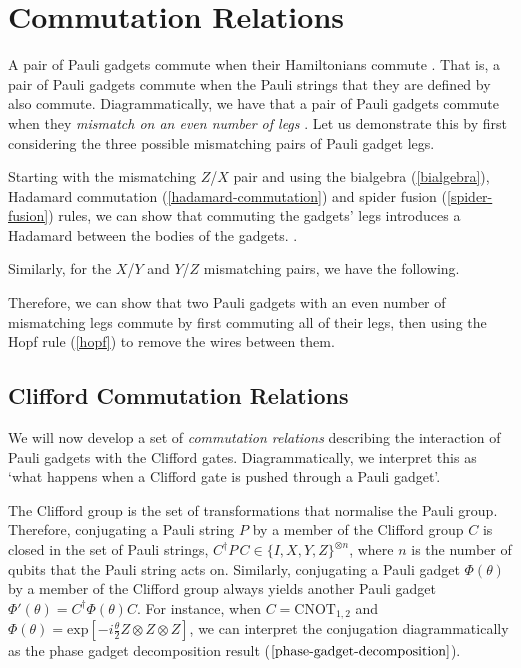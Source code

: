 \section{Commutation Relations}%
\label{commutation-relations}

A pair of Pauli gadgets commute when their Hamiltonians commute \cite{Yeung2020}. That is, a pair of Pauli gadgets commute when the Pauli strings that they are defined by also commute. Diagrammatically, we have that a pair of Pauli gadgets commute when they \textit{mismatch on an even number of legs} \cite{Yeung2020}. Let us demonstrate this by first considering the three possible mismatching pairs of Pauli gadget legs.


Starting with the mismatching $Z$/$X$ pair and using the bialgebra (\ref{bialgebra}), Hadamard commutation (\ref{hadamard-commutation}) and spider fusion (\ref{spider-fusion}) rules, we can show that commuting the gadgets' legs introduces a Hadamard between the bodies of the gadgets. \cite{Yeung2020}.


Similarly, for the $X$/$Y$ and $Y$/$Z$ mismatching pairs, we have the following.


Therefore, we can show that two Pauli gadgets with an even number of mismatching legs commute by first commuting all of their legs, then using the Hopf rule (\ref{hopf}) to remove the wires between them.


\subsection{Clifford Commutation Relations}%
\label{clifford-commutation-relations}

We will now develop a set of \textit{commutation relations} describing the interaction of Pauli gadgets with the Clifford gates. Diagrammatically, we interpret this as `what happens when a Clifford gate is pushed through a Pauli gadget'.

The Clifford group is the set of transformations that normalise the Pauli group. Therefore, conjugating a Pauli string $P$ by a member of the Clifford group $C$ is closed in the set of Pauli strings, $C^\dagger P \, C \in \{I, X, Y, Z\}^{\otimes n}$, where $n$ is the number of qubits that the Pauli string acts on. Similarly, conjugating a Pauli gadget $\Phi(\theta)$ by a member of the Clifford group always yields another Pauli gadget $\Phi'(\theta) = C^\dagger \Phi(\theta) C$. For instance, when $C = \text{CNOT}_{1, 2}$ and $\Phi(\theta) = \text{exp} \left[ - i\frac{\theta}{2} Z \otimes Z \otimes Z \right]$, we can interpret the conjugation diagrammatically as the phase gadget decomposition result ($\ref{phase-gadget-decomposition}$).

